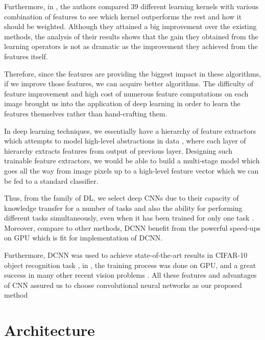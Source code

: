 Furthermore, in \cite{gehler2009feature}, the authors compared 39 different learning kernels with various combination of features to see which kernel outperforms the rest and how it should be weighted. Although they attained a big improvement over the existing methods, the analysis of their results shows that the gain they obtained from the learning operators is not as dramatic as the improvement they achieved from the features itself. 

\indent Therefore, since the features are providing the biggest impact in these algorithms, if we improve those features, we can acquire better algorithms. The difficulty of feature improvement and high cost of numerous feature computations on each image brought us into the application of deep learning in order to learn the features themselves rather than hand-crafting them. 

In deep learning techniques, we essentially have a hierarchy of feature extractors which attempts to model high-level abstractions in data \cite{deng2014deep, bengio2009learning, bengio2013representation}, where each layer of hierarchy extracts features from output of previous layer. Designing such trainable feature extractors, we would be able to build a multi-stage model which goes all the way from image pixels up to a high-level feature vector which we can be fed to a standard classifier. 

Thus, from the family of DL, we select deep CNNs due to their capacity of knowledge transfer for a number of tasks and also the ability for performing different tasks simultaneously, even when it has been trained for only one task \cite{zhou2014learning}. Moreover, compare to other methods, DCNN benefit from the powerful speed-ups on GPU which is fit for implementation of DCNN. 

Furthermore, DCNN was used to achieve state-of-the-art results in CIFAR-10 object recognition task \cite{cirecsan2012multi}, in \cite{russakovsky2015imagenet}, the training process was done on GPU, and a great success in many other recent vision problems \cite{ciresan2015multi}. All these features and advantages of CNN assured us to choose convolutional neural networks as our proposed method

\section{Architecture}

